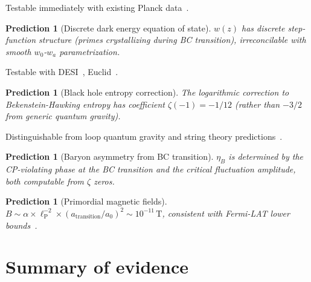 \documentclass[11pt,a4paper]{article}
\newtheorem{prediction}[theorem]{Prediction}
\newcommand{\lP}{\ell_{\mathrm{P}}}
\begin{document}
Testable immediately with existing Planck data~\cite{Planck2020}.

\begin{prediction}[Discrete dark energy equation of state]
\label{pred:wz}
$w(z)$ has discrete step-function structure (primes crystallizing
during BC transition), irreconcilable with smooth $w_0$-$w_a$
parametrization.
\end{prediction}

Testable with DESI~\cite{DESI2024}, Euclid~\cite{Euclid2024}.

\begin{prediction}[Black hole entropy correction]
\label{pred:bh}
The logarithmic correction to Bekenstein-Hawking entropy has
coefficient $\zeta(-1) = -1/12$ (rather than $-3/2$ from
generic quantum gravity).
\end{prediction}

Distinguishable from loop quantum gravity and string theory
predictions~\cite{Sen2012}.

\begin{prediction}[Baryon asymmetry from BC transition]
\label{pred:eta}
$\eta_B$ is determined by the CP-violating phase at the BC
transition and the critical fluctuation amplitude, both
computable from $\zeta$ zeros.
\end{prediction}

\begin{prediction}[Primordial magnetic fields]
\label{pred:B}
$B \sim \alpha \times \lP^{-2} \times (a_{\mathrm{transition}}/a_0)^2
\sim 10^{-11}\,\mathrm{T}$,
consistent with Fermi-LAT lower bounds~\cite{FermiLAT2010}.
\end{prediction}

\section{Summary of evidence}
\label{sec:summary}
\end{document}
